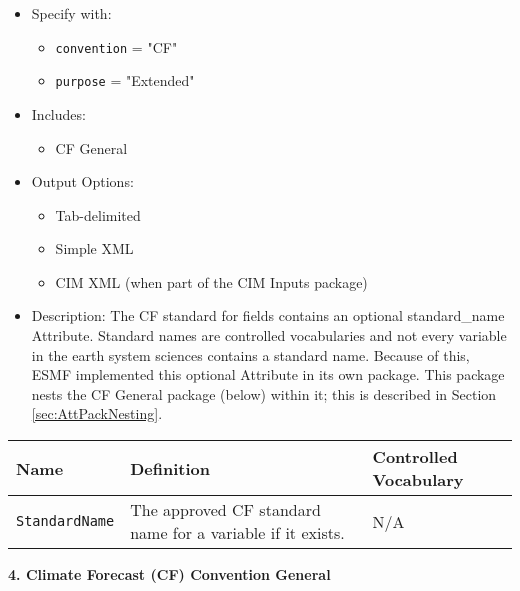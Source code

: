 \begin{itemize}
    \item Specify with:
    \begin{itemize}
        \item {\tt convention} = "CF"
        \item {\tt purpose} = "Extended"
    \end{itemize}
    \item Includes: 
    \begin{itemize}
        \item CF General
    \end{itemize}
    \item Output Options: 
    \begin{itemize}
        \item Tab-delimited
        \item Simple XML
        \item CIM XML (when part of the CIM Inputs package)
    \end{itemize} 
    \item Description: The CF standard for fields contains an optional standard\_name Attribute. Standard names are controlled vocabularies and not every variable in the earth system sciences contains a standard name. Because of this, ESMF implemented this optional Attribute in its own package. This package nests the CF General package (below) within it; this is described in Section \ref{sec:AttPackNesting}.
\end{itemize}

\begin{tabular}{|p{5cm}|p{5cm}|p{35mm}|}
    \hline\hline
    {\bf Name } & {\bf Definition} & {\bf Controlled Vocabulary} \\
    \hline\hline
    {\tt StandardName} & The approved CF standard name for a variable if it exists. &  N/A\\
    \hline\hline
\end{tabular}

\vspace{.20in}

{\bf 4. Climate Forecast (CF) Convention General}

